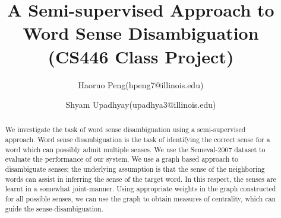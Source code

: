 \documentclass[11pt,letterpaper]{article}
\newcommand{\blue}[1]{\textcolor{RoyalBlue}{#1}}
\newcommand{\instructions}[1]{\blue{\textit{#1}}}
\begin{document}
\title{A Semi-supervised Approach to Word Sense Disambiguation \\ \Large{(CS446 Class Project)}}
\author{Haoruo Peng(hpeng7@illinois.edu) \and Shyam Upadhyay(upadhya3@illinois.edu)}
\maketitle





\begin{abstract}
We investigate the task of word sense disambiguation using a semi-supervised approach. Word sense disambiguation is the task of identifying the correct sense for a word which can possibly admit multiple senses. We use the Semeval-2007 dataset to evaluate the performance of our system. We use a graph based approach to disambiguate senses; the underlying assumption is that the sense of the neighboring words can assist in inferring the sense of the target word. In this respect, the senses are learnt in a somewhat joint-manner. Using appropriate weights in the graph constructed for all possible senses, we can use the graph to obtain measures of centrality, which can guide the sense-disambiguation.
\end{abstract}
\end{document}
